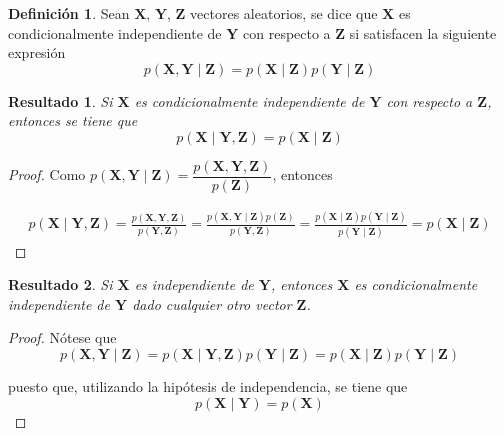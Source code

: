 \documentclass[
  spanish,
]{book}
\newtheorem{proposition}{Resultado}[chapter]
\theoremstyle{definition}
\newtheorem{definition}{Definición}[chapter]
\theoremstyle{definition}
\theoremstyle{definition}
\theoremstyle{remark}
\begin{document}
\begin{definition}
\protect\hypertarget{def:unnamed-chunk-6}{}{\label{def:unnamed-chunk-6} }Sean \(\mathbf{X}\), \(\mathbf{Y}\), \(\mathbf{Z}\) vectores aleatorios, se dice que \(\mathbf{X}\) es condicionalmente independiente de \(\mathbf{Y}\) con respecto a \(\mathbf{Z}\) si satisfacen la siguiente expresión
\begin{equation}
p(\mathbf{X},\mathbf{Y} \mid \mathbf{Z})=p(\mathbf{X} \mid \mathbf{Z})p(\mathbf{Y} \mid \mathbf{Z})
\end{equation}
\end{definition}

\begin{proposition}
\protect\hypertarget{prp:Res122}{}{\label{prp:Res122} }Si \(\mathbf{X}\) es condicionalmente independiente de \(\mathbf{Y}\) con respecto a \(\mathbf{Z}\), entonces se tiene que
\begin{equation}
p(\mathbf{X} \mid \mathbf{Y},\mathbf{Z})=p(\mathbf{X} \mid \mathbf{Z})
\end{equation}
\end{proposition}

\begin{proof}
\iffalse{} {Prueba. } \fi{}Como \(p(\mathbf{X},\mathbf{Y} \mid \mathbf{Z})=\dfrac{p(\mathbf{X},\mathbf{Y},\mathbf{Z})}{p(\mathbf{Z})}\), entonces

\begin{align*}
p(\mathbf{X} \mid \mathbf{Y},\mathbf{Z})=\frac{p(\mathbf{X},\mathbf{Y},\mathbf{Z})}{p(\mathbf{Y},\mathbf{Z})}
=\frac{p(\mathbf{X},\mathbf{Y} \mid \mathbf{Z})p(\mathbf{Z})}{p(\mathbf{Y},\mathbf{Z})}
=\frac{p(\mathbf{X} \mid \mathbf{Z})p(\mathbf{Y} \mid \mathbf{Z})}{p(\mathbf{Y} \mid \mathbf{Z})}=p(\mathbf{X} \mid \mathbf{Z})
\end{align*}
\end{proof}

\begin{proposition}
\protect\hypertarget{prp:unnamed-chunk-8}{}{\label{prp:unnamed-chunk-8} }Si \(\mathbf{X}\) es independiente de \(\mathbf{Y}\), entonces \(\mathbf{X}\) es condicionalmente independiente de \(\mathbf{Y}\) dado cualquier otro vector \(\mathbf{Z}\).
\end{proposition}

\begin{proof}
\iffalse{} {Prueba. } \fi{}Nótese que
\begin{equation*}
p(\mathbf{X},\mathbf{Y}\mid \mathbf{Z})=p(\mathbf{X} \mid \mathbf{Y},\mathbf{Z})p(\mathbf{Y} \mid \mathbf{Z})=p(\mathbf{X} \mid \mathbf{Z})p(\mathbf{Y} \mid \mathbf{Z})
\end{equation*}

puesto que, utilizando la hipótesis de independencia, se tiene que
\begin{equation*}
p(\mathbf{X} \mid \mathbf{Y})=p(\mathbf{X})
\end{equation*}
\end{proof}
\end{document}
